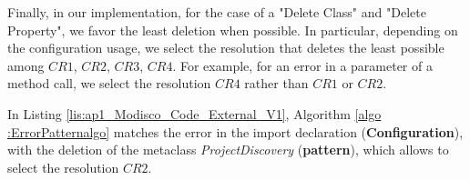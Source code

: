 %
Finally, in our implementation, for the case of a "Delete Class" and "Delete Property", we favor the least deletion when possible. In particular, depending on the configuration usage, we select the resolution that deletes the least possible among $CR1$, $CR2$, $CR3$, $CR4$. For example, for an error in a parameter of a method call, we select the resolution $CR4$ rather than $CR1$ or $CR2$. 


In Listing \ref{lis:ap1_Modisco_Code_External_V1}, Algorithm \ref{algo :ErrorPatternalgo} matches the error in the import declaration (\textbf{Configuration}), with the deletion of the metaclass \textit{ProjectDiscovery} (\textbf{pattern}), which allows to select the resolution $CR2$.










